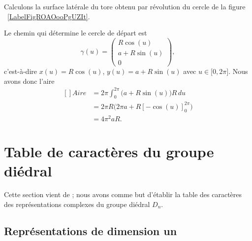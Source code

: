 \begin{example}
	Calculons la surface latérale du tore obtenu par révolution du cercle de la figure ~\ref{LabelFigROAOooPgUZIt}. %
	\newcommand{\CaptionFigROAOooPgUZIt}{Si nous tournons ce cercle autour de l'axe \( X\), nous obtenons un tore de rayon «externe» \( a\) et de rayon «interne» \( R\).}
	

	Le chemin qui détermine le cercle de départ est
	\begin{equation}
		\gamma(u)=\begin{pmatrix}
			R\cos(u)   \\
			a+R\sin(u) \\
			0
		\end{pmatrix},
	\end{equation}
	c'est-à-dire \( x(u)=R\cos(u)\), \( y(u)=a+R\sin(u)\) avec \( u\in\mathopen[ 0 , 2\pi \mathclose]\). Nous avons donc l'aire
	\begin{equation}
		\begin{aligned}[]
			Aire & =2\pi\int_0^{2\pi}\big( a+R\sin(u) \big)R\,du  \\
			     & =2\pi R\big( 2\pi a+R[-\cos(u)]_0^{2\pi} \big) \\
			     & =4\pi^2aR.
		\end{aligned}
	\end{equation}
\end{example}

\section{Table de caractères du groupe diédral}
\label{SecWMzheKf}
Cette section vient de \cite{KXjFWKA}; nous avons comme but d'établir la table des caractères des représentations complexes du groupe diédral \( D_n\).

\subsection{Représentations de dimension un}

